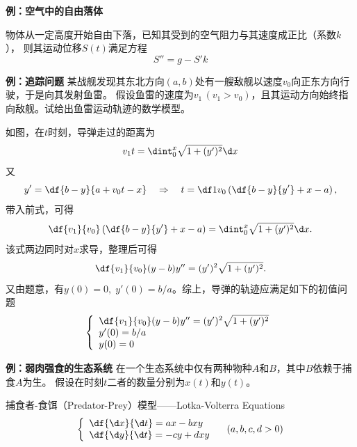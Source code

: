 {\bf 例：空气中的自由落体}

物体从一定高度开始自由下落，已知其受到的空气阻力与其速度成正比（系数$k$），
则其运动位移$S(t)$满足方程
$$S''=g-S'k$$

{\bf 例：追踪问题}
某战舰发现其东北方向$(a,b)$处有一艘敌舰以速度$v_0$向正东方向行驶，于是向其发射鱼雷。
假设鱼雷的速度为$v_1\,(v_1>v_0)$，且其运动方向始终指向敌舰。试给出鱼雷运动轨迹的数学模型。

\begin{center}
\end{center}

如图，在$t$时刻，导弹走过的距离为
$$v_1t=\dint_0^x\sqrt{1+(y')^2}\d x$$
又
$$y'=\df{b-y}{a+v_0t-x}\quad\Rightarrow\quad
t=\df1{v_0}\left(\df{b-y}{y'}+x-a\right),$$
带入前式，可得
$$\df{v_1}{v_0}\left(\df{b-y}{y'}+x-a\right)=\dint_0^x\sqrt{1+(y')^2}\d
x.$$
该式两边同时对$x$求导，整理后可得
$$\df{v_1}{v_0}(y-b)y''=(y')^2\sqrt{1+(y')^2}.$$
又由题意，有$y(0)=0,\;y'(0)=b/a$。综上，导弹的轨迹应满足如下的{\kaishu 初值问题}
$$
\left\{\begin{array}{l}
\df{v_1}{v_0}(y-b)y''=(y')^2\sqrt{1+(y')^2}\\
y'(0)=b/a\\
y(0)=0
\end{array}
\right.
$$

{\bf 例：弱肉强食的生态系统}
在一个生态系统中仅有两种物种$A$和$B$，其中$B$依赖于捕食$A$为生。
假设在时刻$t$二者的数量分别为$x(t)$和$y(t)$。

{\kaishu 捕食者-食饵（Predator-Prey）模型}——Lotka-Volterra Equations
$$
	\left\{\begin{array}{l}
		\df{\d x}{\d t}=ax-bxy\\
		\df{\d y}{\d t}=-cy+dxy
	\end{array}\right.
	\quad (a,b,c,d>0)
$$

